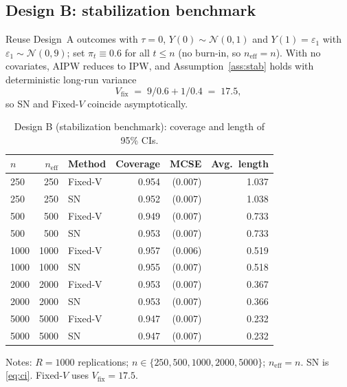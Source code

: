 \documentclass[11pt]{article}
\numberwithin{equation}{section}
\newcommand{\mcse}[1]{{\footnotesize\,(#1)}}
\theoremstyle{plain}
\theoremstyle{definition}
\theoremstyle{remark}
\begin{document}
\subsection{Design B: stabilization benchmark}\label{sec:sim_B}

Reuse Design~A outcomes with $\tau=0$, $Y(0)\sim\mathcal{N}(0,1)$ and $Y(1)=\varepsilon_1$ with $\varepsilon_1\sim\mathcal{N}(0,9)$; set $\pi_t\equiv 0.6$ for all $t\le n$ (no burn-in, so $n_{\mathrm{eff}}=n$). With no covariates, AIPW reduces to IPW, and Assumption~\ref{ass:stab} holds with deterministic long-run variance
\[
V_{\mathrm{fix}} \;=\; 9/0.6 + 1/0.4 \;=\; 17.5,
\]
so SN and Fixed-$V$ coincide asymptotically.

\begin{table}[!htbp]
\centering
\small
\begin{threeparttable}
\caption{Design B (stabilization benchmark): coverage and length of 95\% CIs.}
\label{tab:simB}
\begin{tabular}{@{}l r l r r r@{}}
\toprule
{$n$} & {$n_{\mathrm{eff}}$} & {Method} & {Coverage} & {MCSE} & {Avg.\ length} \\
\midrule
250 & 250 & Fixed-V & 0.954 & \mcse{0.007} & 1.037 \\
250 & 250 & SN & 0.952 & \mcse{0.007} & 1.038 \\
500 & 500 & Fixed-V & 0.949 & \mcse{0.007} & 0.733 \\
500 & 500 & SN & 0.953 & \mcse{0.007} & 0.733 \\
1000 & 1000 & Fixed-V & 0.957 & \mcse{0.006} & 0.519 \\
1000 & 1000 & SN & 0.955 & \mcse{0.007} & 0.518 \\
2000 & 2000 & Fixed-V & 0.953 & \mcse{0.007} & 0.367 \\
2000 & 2000 & SN & 0.953 & \mcse{0.007} & 0.366 \\
5000 & 5000 & Fixed-V & 0.947 & \mcse{0.007} & 0.232 \\
5000 & 5000 & SN & 0.947 & \mcse{0.007} & 0.232 \\
\bottomrule
\end{tabular}
\begin{tablenotes}[flushleft]
\footnotesize
\item Notes: $R=1000$ replications; $n\in\{250,500,1000,2000,5000\}$; $n_{\mathrm{eff}}=n$. SN is \eqref{eq:ci}. Fixed-$V$ uses $V_{\mathrm{fix}}=17.5$.
\end{tablenotes}
\end{threeparttable}
\end{table}
\end{document}
